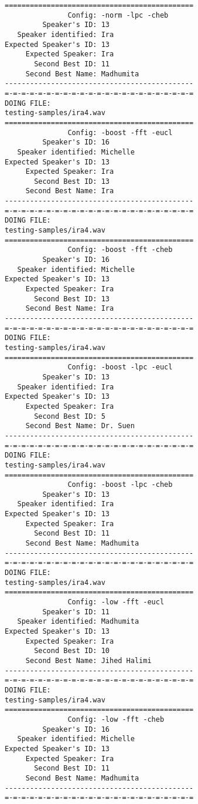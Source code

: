 \begin{verbatim}
=============================================
               Config: -norm -lpc -cheb
         Speaker's ID: 13
   Speaker identified: Ira
Expected Speaker's ID: 13
     Expected Speaker: Ira
       Second Best ID: 11
     Second Best Name: Madhumita
---------------------------------------------
=-=-=-=-=-=-=-=-=-=-=-=-=-=-=-=-=-=-=-=-=-=-=
DOING FILE:
testing-samples/ira4.wav
=============================================
               Config: -boost -fft -eucl
         Speaker's ID: 16
   Speaker identified: Michelle
Expected Speaker's ID: 13
     Expected Speaker: Ira
       Second Best ID: 13
     Second Best Name: Ira
---------------------------------------------
=-=-=-=-=-=-=-=-=-=-=-=-=-=-=-=-=-=-=-=-=-=-=
DOING FILE:
testing-samples/ira4.wav
=============================================
               Config: -boost -fft -cheb
         Speaker's ID: 16
   Speaker identified: Michelle
Expected Speaker's ID: 13
     Expected Speaker: Ira
       Second Best ID: 13
     Second Best Name: Ira
---------------------------------------------
=-=-=-=-=-=-=-=-=-=-=-=-=-=-=-=-=-=-=-=-=-=-=
DOING FILE:
testing-samples/ira4.wav
=============================================
               Config: -boost -lpc -eucl
         Speaker's ID: 13
   Speaker identified: Ira
Expected Speaker's ID: 13
     Expected Speaker: Ira
       Second Best ID: 5
     Second Best Name: Dr. Suen
---------------------------------------------
=-=-=-=-=-=-=-=-=-=-=-=-=-=-=-=-=-=-=-=-=-=-=
DOING FILE:
testing-samples/ira4.wav
=============================================
               Config: -boost -lpc -cheb
         Speaker's ID: 13
   Speaker identified: Ira
Expected Speaker's ID: 13
     Expected Speaker: Ira
       Second Best ID: 11
     Second Best Name: Madhumita
---------------------------------------------
=-=-=-=-=-=-=-=-=-=-=-=-=-=-=-=-=-=-=-=-=-=-=
DOING FILE:
testing-samples/ira4.wav
=============================================
               Config: -low -fft -eucl
         Speaker's ID: 11
   Speaker identified: Madhumita
Expected Speaker's ID: 13
     Expected Speaker: Ira
       Second Best ID: 10
     Second Best Name: Jihed Halimi
---------------------------------------------
=-=-=-=-=-=-=-=-=-=-=-=-=-=-=-=-=-=-=-=-=-=-=
DOING FILE:
testing-samples/ira4.wav
=============================================
               Config: -low -fft -cheb
         Speaker's ID: 16
   Speaker identified: Michelle
Expected Speaker's ID: 13
     Expected Speaker: Ira
       Second Best ID: 11
     Second Best Name: Madhumita
---------------------------------------------
=-=-=-=-=-=-=-=-=-=-=-=-=-=-=-=-=-=-=-=-=-=-=

\end{verbatim}
